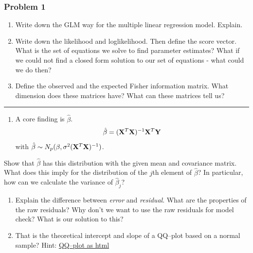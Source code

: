 \documentclass[
]{article}
\providecommand{\tightlist}{%
  \setlength{\itemsep}{0pt}\setlength{\parskip}{0pt}}
\begin{document}
\hypertarget{problem-1}{%
\subsubsection{Problem 1}\label{problem-1}}

\begin{enumerate}
\def\labelenumi{\arabic{enumi}.}
\item
  Write down the GLM way for the multiple linear regression model.
  Explain.
\item
  Write down the likelihood and loglikelihood. Then define the score
  vector. What is the set of equations we solve to find parameter
  estimates? What if we could not find a closed form solution to our set
  of equations - what could we do then?
\item
  Define the observed and the expected Fisher information matrix. What
  dimension does these matrices have? What can these matrices tell us?
\end{enumerate}

\begin{center}\rule{0.5\linewidth}{0.5pt}\end{center}

\begin{enumerate}
\def\labelenumi{\arabic{enumi}.}
\setcounter{enumi}{3}
\tightlist
\item
  A core finding is \(\hat \beta\).
  \[ \hat{\beta}=({\bf X}^T{\bf X})^{-1} {\bf X}^T {\bf Y}\] with
  \(\hat{\beta}\sim N_{p}(\beta,\sigma^2({\bf X}^T{\bf X})^{-1})\).
\end{enumerate}

Show that \(\hat{\beta}\) has this distribution with the given mean and
covariance matrix. What does this imply for the distribution of the
\(j\)th element of \(\hat{\beta}\)? In particular, how can we calculate
the variance of \(\hat{\beta}_j\)?

\begin{enumerate}
\def\labelenumi{\arabic{enumi}.}
\setcounter{enumi}{4}
\item
  Explain the difference between \emph{error} and \emph{residual}. What
  are the properties of the raw residuals? Why don't we want to use the
  raw residuals for model check? What is our solution to this?
\item
  That is the theoretical intercept and slope of a QQ--plot based on a
  normal sample? Hint:
  \href{https://www.math.ntnu.no/emner/TMA4315/2017h/qq.html}{QQ--plot
  as html}
\end{enumerate}
\end{document}
